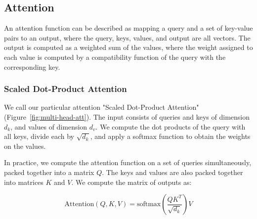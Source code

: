
\subsection{Attention} \label{sec:attention}
An attention function can be described as mapping a query and a set of
key-value pairs to an output, where the query, keys, values, and output are all
vectors.  The output is computed as a weighted sum of the values, where the
weight assigned to each value is computed by a compatibility function of the
query with the corresponding key.

\subsubsection{Scaled Dot-Product Attention} \label{sec:scaled-dot-prod}


We call our particular attention "Scaled Dot-Product Attention"
(Figure~\ref{fig:multi-head-att}).   The input consists of queries and keys of
dimension $d_k$, and values of dimension $d_v$.  We compute the dot products of
the query with all keys, divide each by $\sqrt{d_k}$, and apply a softmax
function to obtain the weights on the values.

In practice, we compute the attention function on a set of queries
simultaneously, packed together into a matrix $Q$.   The keys and values are
also packed together into matrices $K$ and $V$.  We compute the matrix of
outputs as:

\begin{equation}
  \mathrm{Attention}(Q, K, V) = \mathrm{softmax}(\frac{QK^T}{\sqrt{d_k}})V
\end{equation}

